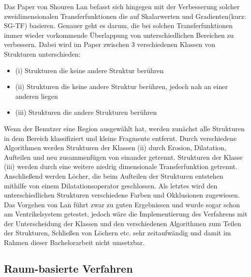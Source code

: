 Das Paper von Shouren Lan \cite{lan2017improving} befasst sich hingegen mit der Verbesserung solcher zweidimensionalen Transferfunktionen die auf Skalarwerten und Gradienten(kurz: SG-TF) basieren.
Genauer geht es darum, die bei solchen Transferfunktionen immer wieder vorkommende Überlappung von unterschiedlichen Bereichen zu verbessern.
Dabei wird im Paper zwischen 3 verschiedenen Klassen von Strukturen unterschieden:
\begin{itemize}
\item (i) Strukturen die keine andere Struktur berühren
\item (ii) Strukturen die keine andere Struktur berühren, jedoch nah an einer anderen liegen
\item (iii) Strukturen die andere Strukturen berühren
\end{itemize} 
Wenn der Benutzer eine Region ausgewählt hat, werden zunächst alle Strukturen in dem Bereich klassifiziert und kleine Fragmente entfernt. Durch verschiedene Algorithmen werden Strukturen der Klassen (ii) durch Erosion, Dilatation, Aufteilen und neu zusammenfügen von einander getrennt. Strukturen der Klasse (iii) werden durch eine weitere niedrig dimensionale Transferfunktion getrennt.
Anschließend werden Löcher, die beim Aufteilen der Strukturen entstehen mithilfe von einem Dilatationsoperator geschlossen. Als letztes wird den unterschiedlichen Strukturen verschiedene Farben und Okklusionen zugewiesen.
\newline
Das Vorgehen von Lan führt zwar zu guten Ergebnissen und wurde sogar schon am Ventrikelsystem getestet, jedoch wäre die Implementierung des Verfahrens mit der Unterscheidung der Klassen und den verschiedenen Algorithmen zum Teilen der Strukturen, Schließen von Löchern etc. sehr zeitaufwändig und damit im Rahmen dieser Bachelorarbeit  nicht umsetzbar.



\subsection{Raum-basierte Verfahren}

